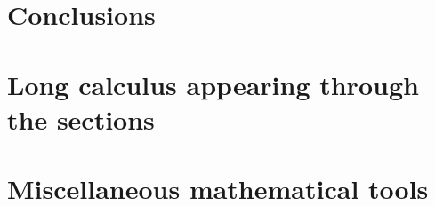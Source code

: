 \documentclass[12pt, letterpaper, twoside]{article}
\numberwithin{equation}{section}
\numberwithin{figure}{section}
\numberwithin{table}{section}
\begin{document}
\section[Conclusions]
{Conclusions}






\appendix

\section{Long calculus appearing through the sections}


\section{Miscellaneous mathematical tools}



{}

\end{document}
